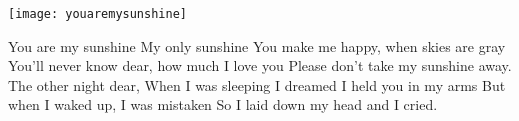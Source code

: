 \begin{intersong}
    \texttt{[image: youaremysunshine]}
\end{intersong}
\beginverse*
You are my sunshine
My only sunshine
You make me happy, when skies are gray
You’ll never know dear, how much I love you
Please don’t take my sunshine away.
\endverse
\beginverse*
The other night dear,
When I was sleeping
I dreamed I held you in my arms
But when I waked up, I was mistaken
So I laid down my head and I cried.
\endverse
\endsong
